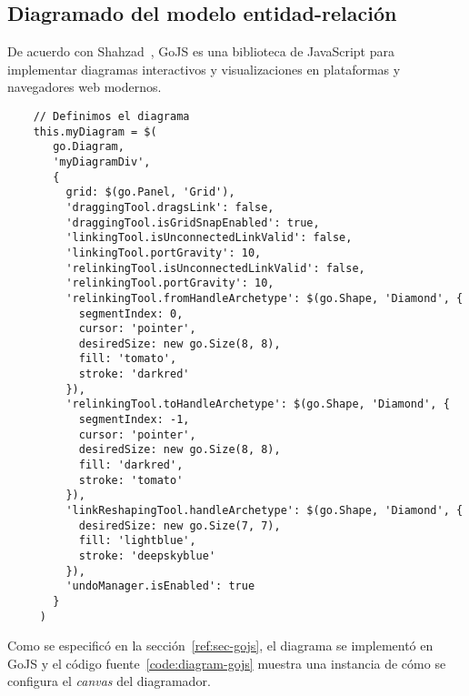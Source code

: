 \subsection{Diagramado del modelo entidad-relación}
De acuerdo con Shahzad~\cite{shahzad_review_2016}, GoJS es una biblioteca de JavaScript para implementar diagramas interactivos y visualizaciones en plataformas y navegadores web modernos. 

\newenvironment{code}{\captionsetup{type=listing}}{}

\begin{code}
\label{code:diagram-gojs}
\begin{verbatim}
    // Definimos el diagrama
    this.myDiagram = $(
       go.Diagram,
       'myDiagramDiv', 
       {
         grid: $(go.Panel, 'Grid'),
         'draggingTool.dragsLink': false,
         'draggingTool.isGridSnapEnabled': true,
         'linkingTool.isUnconnectedLinkValid': false,
         'linkingTool.portGravity': 10,
         'relinkingTool.isUnconnectedLinkValid': false,
         'relinkingTool.portGravity': 10,
         'relinkingTool.fromHandleArchetype': $(go.Shape, 'Diamond', {
           segmentIndex: 0,
           cursor: 'pointer',
           desiredSize: new go.Size(8, 8),
           fill: 'tomato',
           stroke: 'darkred'
         }),
         'relinkingTool.toHandleArchetype': $(go.Shape, 'Diamond', {
           segmentIndex: -1,
           cursor: 'pointer',
           desiredSize: new go.Size(8, 8),
           fill: 'darkred',
           stroke: 'tomato'
         }),
         'linkReshapingTool.handleArchetype': $(go.Shape, 'Diamond', {
           desiredSize: new go.Size(7, 7),
           fill: 'lightblue',
           stroke: 'deepskyblue'
         }),
         'undoManager.isEnabled': true
       }
     )
 \end{verbatim}
\end{code}


Como se especificó en la sección~\ref{ref:sec-gojs}, el diagrama se implementó en GoJS y el código fuente~\ref{code:diagram-gojs} muestra una instancia de cómo se configura el \textit{canvas} del diagramador.